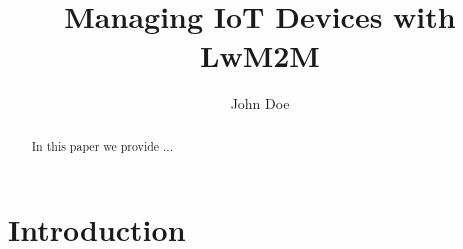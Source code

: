 \documentclass[11pt,sigconf]{iabart}
\begin{document}
\title{Managing IoT Devices with LwM2M}


\author{John Doe}

\begin{abstract}








In this paper we provide ...

\end{abstract}


\maketitle

\section{Introduction} \label{introduction}
\end{document}
